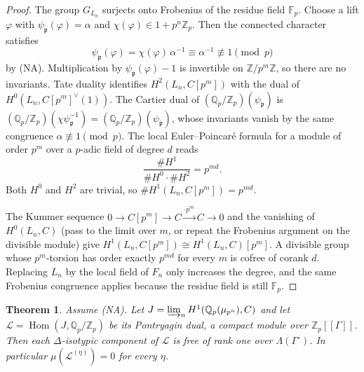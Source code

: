 \documentclass[11pt]{article}
\newtheorem{theorem}{Theorem}[section]
\theoremstyle{definition}
\theoremstyle{remark}
\newcommand{\Z}{\mathbb{Z}}
\newcommand{\Q}{\mathbb{Q}}
\newcommand{\F}{\mathbb{F}}
\newcommand{\Hom}{\operatorname{Hom}}
\newcommand{\pp}{\mathfrak{p}}
\newcommand{\ppb}{\overline{\mathfrak{p}}}
\newcommand{\cL}{\mathcal{L}}
\newcommand{\Lam}{\Lambda}
\newcommand{\Gam}{\Gamma^{\circ}}
\begin{document}
\begin{proof}
The group \(G_{L_n}\) surjects onto Frobenius of the residue field \(\F_p\). Choose a lift \(\varphi\) with \(\psi_{\ppb}(\varphi)=\alpha\) and \(\chi(\varphi)\in 1+p^n\Z_p\). Then the connected character satisfies
\[
\psi_{\pp}(\varphi)=\chi(\varphi)\,\alpha^{-1}\equiv\alpha^{-1}\not\equiv 1\pmod{p}
\]
by (NA). Multiplication by \(\psi_{\pp}(\varphi)-1\) is invertible on \(\Z/p^m\Z\), so there are no invariants. Tate duality identifies \(H^2(L_n,C[p^m])\) with the dual of \(H^0(L_n,C[p^m]^\vee(1))\). The Cartier dual of \((\Q_p/\Z_p)(\psi_{\pp})\) is \((\Q_p/\Z_p)(\chi\psi_{\pp}^{-1})=(\Q_p/\Z_p)(\psi_{\ppb})\), whose invariants vanish by the same congruence \(\alpha\not\equiv 1\pmod{p}\). The local Euler--Poincar\'e formula for a module of order \(p^m\) over a \(p\)-adic field of degree \(d\) reads
\[
\frac{\#H^1}{\#H^0\cdot\#H^2}=p^{md}.
\]
Both \(H^0\) and \(H^2\) are trivial, so \(\#H^1(L_n,C[p^m])=p^{md}\).

The Kummer sequence \(0\to C[p^m]\to C\xrightarrow{\cdot p^m}C\to 0\) and the vanishing of \(H^0(L_n,C)\) (pass to the limit over \(m\), or repeat the Frobenius argument on the divisible module) give \(H^1(L_n,C[p^m])\cong H^1(L_n,C)[p^m]\). A divisible group whose \(p^m\)-torsion has order exactly \(p^{m d}\) for every \(m\) is cofree of corank \(d\). Replacing \(L_n\) by the local field of \(F_n\) only increases the degree, and the same Frobenius congruence applies because the residue field is still \(\F_p\).
\end{proof}

\begin{theorem}
\label{thm:freeness}
Assume \textup{(NA)}. Let \(J=\varinjlim_n H^1(\Q_p(\mu_{p^n}),C)\) and let \(\cL=\Hom(J,\Q_p/\Z_p)\) be its Pontryagin dual, a compact module over \(\Z_p[[\Gamma]]\). Then each \(\Delta\)-isotypic component of \(\cL\) is free of rank one over \(\Lam(\Gam)\). In particular \(\mu(\cL^{(\eta)})=0\) for every \(\eta\).
\end{theorem}
\end{document}

